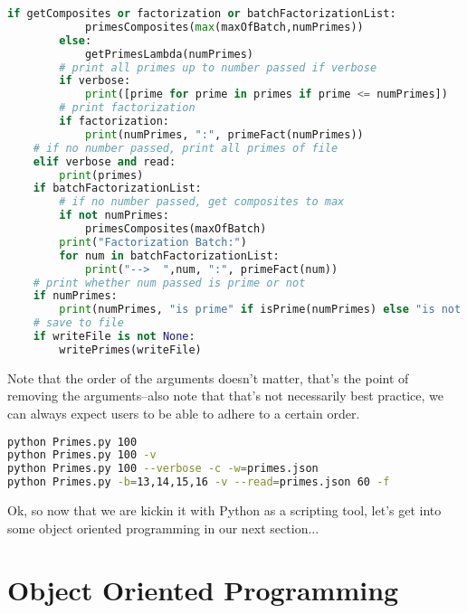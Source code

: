 \documentclass[11pt, twoside, reqno]{book}
\begin{document}
\begin{lstlisting}[language=Python]
        if getComposites or factorization or batchFactorizationList:
            primesComposites(max(maxOfBatch,numPrimes))
        else:
            getPrimesLambda(numPrimes)
        # print all primes up to number passed if verbose
        if verbose:
            print([prime for prime in primes if prime <= numPrimes])
        # print factorization
        if factorization:
            print(numPrimes, ":", primeFact(numPrimes))
    # if no number passed, print all primes of file
    elif verbose and read:
        print(primes)
    if batchFactorizationList:
        # if no number passed, get composites to max
        if not numPrimes:
            primesComposites(maxOfBatch)
        print("Factorization Batch:")
        for num in batchFactorizationList:
            print("-->  ",num, ":", primeFact(num))
    # print whether num passed is prime or not
    if numPrimes:
        print(numPrimes, "is prime" if isPrime(numPrimes) else "is not prime")
    # save to file
    if writeFile is not None:
        writePrimes(writeFile)
\end{lstlisting}

Note that the order of the arguments doesn't matter, that's the point of removing the arguments--also note that that's not necessarily best practice, we can always expect users to be able to adhere to a certain order.
\begin{lstlisting}[language=sh]
python Primes.py 100
python Primes.py 100 -v
python Primes.py 100 --verbose -c -w=primes.json
python Primes.py -b=13,14,15,16 -v --read=primes.json 60 -f
\end{lstlisting}

Ok, so now that we are kickin it with Python as a scripting tool, let's get into some object oriented programming in our next section...

\section{Object Oriented Programming}
\end{document}
